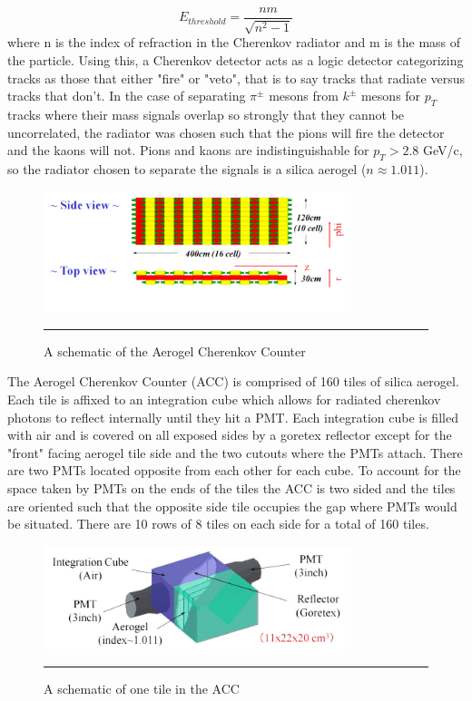 \begin{equation}
E_{threshold} = \frac{nm}{\sqrt{n^2-1}}
\end{equation}
where n is the index of refraction in the Cherenkov radiator and m is the mass of the particle.
Using this, a Cherenkov detector acts as a logic detector categorizing tracks as those that either "fire" or "veto", that is to say tracks that radiate versus tracks that don't. In the case of separating $\pi^{\pm}$ mesons from $k^{\pm}$ mesons for $p_{T}$ tracks where their mass signals overlap so strongly that they cannot be uncorrelated, the radiator was chosen such that the pions will fire the detector and the kaons will not. Pions and kaons are indistinguishable for $p_{T} > 2.8$ GeV/c, so the radiator chosen to separate the signals is a silica aerogel ($n \approx 1.011$).

\begin{figure}[htbp!]
  \centering
    \includegraphics[width=0.8\textwidth]{Figures/ACCschematic.jpg}
    \rule{35em}{0.5pt}
  \caption[A schematic of the Aerogel Cherenkov Counter]{A schematic of the Aerogel Cherenkov Counter}
  \label{fig:ACCschematic}
\end{figure}

The Aerogel Cherenkov Counter (ACC) is comprised of 160 tiles of silica aerogel. Each tile is affixed to an integration cube which allows for radiated cherenkov photons to reflect internally until they hit a PMT. Each integration cube is filled with air and is covered on all exposed sides by a goretex reflector except for the "front" facing aerogel tile side and the two cutouts where the PMTs attach. There are two PMTs located opposite from each other for each cube. To account for the space taken by PMTs on the ends of the tiles the ACC is two sided and the tiles are oriented such that the opposite side tile occupies the gap where PMTs would be situated.  There are 10 rows of 8 tiles on each side for a total of 160 tiles.

\begin{figure}[htbp!]
  \centering
    \includegraphics[width=0.8\textwidth]{Figures/aerogelchannel.JPG}
    \rule{35em}{0.5pt}
  \caption[A schematic of one tile in the ACC]{A schematic of one tile in the ACC}
  \label{fig:accchannel}
\end{figure}


